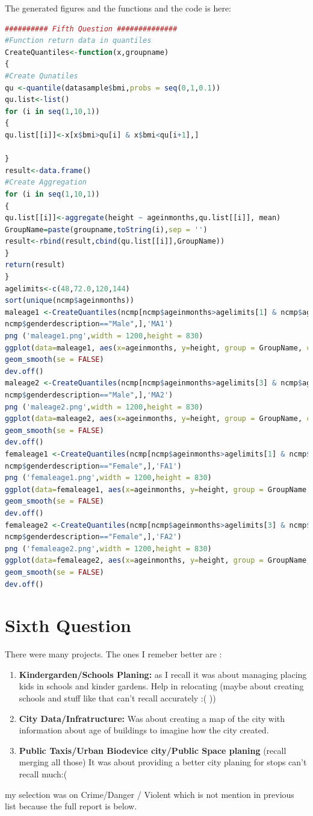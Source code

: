 \documentclass{article}
\begin{document}
The generated figures and the functions and the code is here:
\begin{lstlisting}[language=R]
########## Fifth Question ##############
#Function return data in quantiles
CreateQuantiles<-function(x,groupname)
{
#Create Qunatiles
qu <-quantile(datasample$bmi,probs = seq(0,1,0.1))
qu.list<-list()
for (i in seq(1,10,1))
{
qu.list[[i]]<-x[x$bmi>qu[i] & x$bmi<qu[i+1],]

}
result<-data.frame()
#Create Aggregation
for (i in seq(1,10,1))
{
qu.list[[i]]<-aggregate(height ~ ageinmonths,qu.list[[i]], mean)
GroupName=paste(groupname,toString(i),sep = '')
result<-rbind(result,cbind(qu.list[[i]],GroupName))
}
return(result)
}
agelimits<-c(48,72.0,120,144)
sort(unique(ncmp$ageinmonths))
maleage1 <-CreateQuantiles(ncmp[ncmp$ageinmonths>agelimits[1] & ncmp$ageinmonths<agelimits[2]&
ncmp$genderdescription=="Male",],'MA1')
png ('maleage1.png',width = 1200,height = 830)
ggplot(data=maleage1, aes(x=ageinmonths, y=height, group = GroupName, colour = GroupName)) +
geom_smooth(se = FALSE)
dev.off()
maleage2 <-CreateQuantiles(ncmp[ncmp$ageinmonths>agelimits[3] & ncmp$ageinmonths<agelimits[4]&
ncmp$genderdescription=="Male",],'MA2')
png ('maleage2.png',width = 1200,height = 830)
ggplot(data=maleage2, aes(x=ageinmonths, y=height, group = GroupName, colour = GroupName)) +
geom_smooth(se = FALSE)
dev.off()
femaleage1 <-CreateQuantiles(ncmp[ncmp$ageinmonths>agelimits[1] & ncmp$ageinmonths<agelimits[2]&
ncmp$genderdescription=="Female",],'FA1')
png ('femaleage1.png',width = 1200,height = 830)
ggplot(data=femaleage1, aes(x=ageinmonths, y=height, group = GroupName, colour = GroupName)) +
geom_smooth(se = FALSE)
dev.off()
femaleage2 <-CreateQuantiles(ncmp[ncmp$ageinmonths>agelimits[3] & ncmp$ageinmonths<agelimits[4]&
ncmp$genderdescription=="Female",],'FA2')
png ('femaleage2.png',width = 1200,height = 830)
ggplot(data=femaleage2, aes(x=ageinmonths, y=height, group = GroupName, colour = GroupName)) +
geom_smooth(se = FALSE)
dev.off()
\end{lstlisting}
	\section*{Sixth Question}
There were many projects. The ones I remeber better are : 
\begin{enumerate}
\item \textbf{Kindergarden/Schools Planing:} as I recall it was about managing placing kids in schools and kinder gardens. Help in relocating (maybe about creating schools and stuff like that can't recall accurately :( ))
\item \textbf{City Data/Infratructure:} Was about creating a map of the city with information about age of buildings to imagine how the city created.
\item \textbf{Public Taxis/Urban Biodevice city/Public Space planing} (recall merging all those)  It was about providing a better city planing for stops can't recall much:( 
\end{enumerate} 
 my selection was on Crime/Danger / Violent which is not mention in previous list because the full report is below.\\
\end{document}
